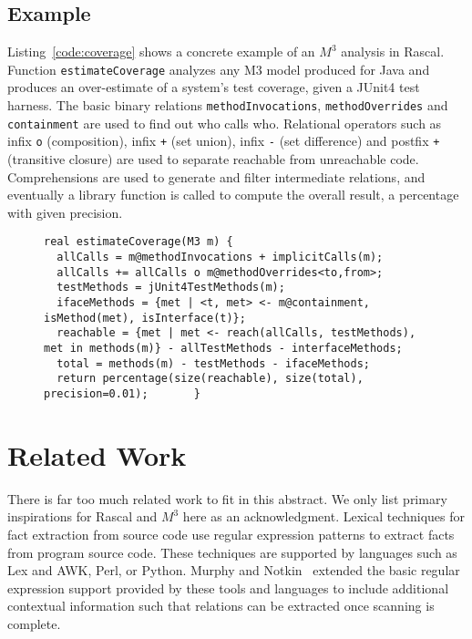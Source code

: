 \documentclass[conference]{IEEEtran}
\newcommand{\mthree}{\ensuremath{M^3}\!\xspace}
\begin{document}
\subsection{Example}

Listing~\ref{code:coverage} shows a concrete example of an \mthree analysis in
Rascal. Function \lstinline{estimateCoverage} analyzes any M3
model produced for Java and produces an over-estimate of a
system's test coverage, given a JUnit4 test harness. The basic
binary relations \lstinline{methodInvocations}, \lstinline{methodOverrides}
and \lstinline{containment} are used to find out who calls who. Relational
operators such as infix \lstinline{o} (composition), infix \lstinline{+} (set
union), infix \lstinline{-} (set difference) and postfix \lstinline{+}
(transitive closure) are used to separate reachable from unreachable code.
Comprehensions are used to generate and filter intermediate relations, and
eventually a library function is called to compute the overall result, a percentage with given
precision.


\begin{figure}[t]

\begin{lstlisting}[caption=Statically estimating test coverage using \mthree., label=code:coverage,language=rascal]
real estimateCoverage(M3 m) {
  allCalls = m@methodInvocations + implicitCalls(m);
  allCalls += allCalls o m@methodOverrides<to,from>;
  testMethods = jUnit4TestMethods(m);
  ifaceMethods = {met | <t, met> <- m@containment, isMethod(met), isInterface(t)};  
  reachable = {met | met <- reach(allCalls, testMethods), met in methods(m)} - allTestMethods - interfaceMethods;
  total = methods(m) - testMethods - ifaceMethods;
  return percentage(size(reachable), size(total), precision=0.01);       }
\end{lstlisting}
\vspace{-5mm}
\end{figure}

\section{Related Work}

There is far too much related work to fit in this abstract. We only list primary inspirations for Rascal and \mthree here as an acknowledgment.
%
Lexical techniques for fact extraction from source code use regular expression patterns to extract facts from
program source code. These techniques are supported by languages such as Lex and AWK, Perl, or Python. Murphy and
Notkin~\cite{DBLP:journals/tosem/MurphyN96} extended the
basic regular expression support provided by these tools and languages
to include additional contextual information such that relations can be extracted once scanning is complete.
\end{document}
